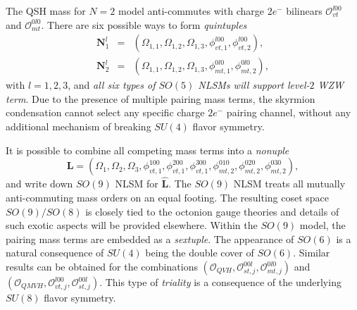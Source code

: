 \documentclass[aps,prb,amsmath,amssymb,floatfix,twocolumn]{revtex4}
\begin{document}
The QSH mass for $N=2$ model anti-commutes with charge $2 e^-$ bilinears $\mathcal{O}_{vt}^{l00}$ and $\mathcal{O}_{mt}^{0l0}$. There are six possible ways to form \emph{quintuples} 
\begin{eqnarray}
\mathbf{N}^{l}_{1}&=&(\Omega_{1,1}, \Omega_{1,2}, \Omega_{1,3}, \phi_{vt,1}^{l00}, \phi_{vt,2}^{l00}), \\
 \mathbf{N}^{l}_{2}&=&(\Omega_{1,1}, \Omega_{1,2}, \Omega_{1,3}, \phi_{mt,1}^{0l0}, \phi_{mt,2}^{0l0}),
 \end{eqnarray} 
with $l=1,2,3$, and \emph{all six types of $SO(5)$ NLSMs will support level-$2$ WZW term}. Due to the presence of multiple pairing mass terms, the skyrmion condensation cannot select any specific charge $2e^-$ pairing channel, without any additional mechanism of breaking $SU(4)$ flavor symmetry. 

It is possible to combine all competing mass terms into a \emph{nonuple} 
\begin{equation}
\mathbf{L}=(\Omega_1, \Omega_2, \Omega_3, \phi_{vt,1}^{100}, \phi_{vt,1}^{200}, \phi_{vt,1}^{300}, \phi_{mt,2}^{010}, \phi_{mt,2}^{020}, \phi_{mt,2}^{030}),
\end{equation} 
and write down $SO(9)$ NLSM for $\hat{\mathbf{L}}$. The $SO(9)$ NLSM treats all mutually anti-commuting mass orders on an equal footing. The resulting coset space $SO(9)/SO(8)$ is closely tied to the octonion gauge theories and details of such exotic aspects will be provided elsewhere. Within the $SO(9)$ model, the pairing mass terms are embedded as a \emph{sextuple}. The appearance of $SO(6)$ is a natural consequence of $SU(4)$ being the double cover of $SO(6)$. Similar results can be obtained for the combinations $(\mathcal{O}_{QVH}, \mathcal{O}_{st,j}^{00l}, \mathcal{O}_{mt,j}^{0l0})$ and $(\mathcal{O}_{QMVH}, \mathcal{O}_{vt,j}^{l00}, \mathcal{O}_{st,j}^{00l})$. This type of \emph{triality} is a consequence of the underlying $SU(8)$ flavor symmetry. \\
\end{document}
